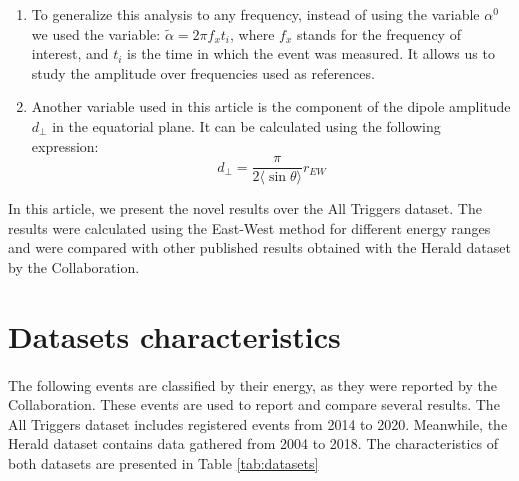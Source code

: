 \documentclass[12pt, doublespace, oneside]{article}
\begin{document}
\begin{enumerate}
      \item To generalize this analysis to any frequency, instead of using the variable $\alpha^0$ we used the variable:
      $\tilde{\alpha} = 2\pi f_x t_i $, where $f_x$ stands for the  frequency  of interest, and $t_i$ is the time in which the event was measured. It allows us to study the amplitude over frequencies used as references.

      \item Another variable used in this article is the component of the dipole amplitude $d_\perp$ in the equatorial plane. It can be calculated using the following expression:
      \begin{equation}
        d_{\perp} = \frac{\pi}{2\langle\sin\theta \rangle} r_{EW} \label{dperp} 
      \end{equation}
      
\end{enumerate}


In this article, we present the novel results over the All Triggers dataset. The results were calculated using the East-West method for different energy ranges and were compared with other published results obtained with the Herald dataset by the Collaboration.

\section{Datasets characteristics}

\paragraph{} The following events are classified by their energy, as they were reported by the Collaboration. These events are used to report and compare several results. The All Triggers dataset includes registered events from 2014 to 2020. Meanwhile, the Herald dataset contains data gathered from 2004 to 2018. The characteristics of both datasets are presented in Table \ref{tab:datasets}
\end{document}
